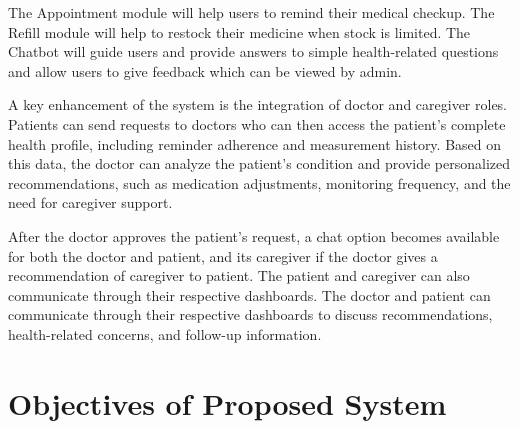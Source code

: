 \documentclass[12pt, a4paper, oneside]{report}
\begin{document}
The Appointment module will help users to remind their medical checkup. The Refill module will help to restock their medicine when stock is limited. The Chatbot will guide users and provide answers to simple health-related questions and allow users to give feedback which can be viewed by admin.

A key enhancement of the system is the integration of doctor and caregiver roles. Patients can send requests to doctors who can then access the patient's complete health profile, including reminder adherence and measurement history. Based on this data, the doctor can analyze the patient's condition and provide personalized recommendations, such as medication adjustments, monitoring frequency, and the need for caregiver support.

After the doctor approves the patient's request, a chat option becomes available for both the doctor and patient, and its caregiver if the doctor gives a recommendation of caregiver to patient. The patient and caregiver can also communicate through their respective dashboards. The doctor and patient can communicate through their respective dashboards to discuss recommendations, health-related concerns, and follow-up information.

\section{Objectives of Proposed System}
\label{sec:objectives}
\end{document}
